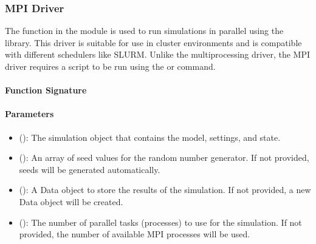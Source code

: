 \documentclass[letterpaper,10pt,english]{sphinxmanual}
\begin{document}
\sphinxstepscope


\subsubsection{MPI Driver}
\label{\detokenize{user_guide/drivers/parallel_driver_mpi:mpi-driver}}\label{\detokenize{user_guide/drivers/parallel_driver_mpi:parallel-driver-mpi}}\label{\detokenize{user_guide/drivers/parallel_driver_mpi::doc}}
\sphinxAtStartPar
The  function in the  module is used to run simulations
in parallel using the  library. This driver is suitable for use in cluster environments
and is compatible with different schedulers like SLURM. Unlike the multiprocessing driver, the MPI driver
requires a script to be run using the  or  command.


\paragraph{Function Signature}
\label{\detokenize{user_guide/drivers/parallel_driver_mpi:function-signature}}
\begin{sphinxVerbatim}[commandchars=\\\{\}]
   
\end{sphinxVerbatim}


\paragraph{Parameters}
\label{\detokenize{user_guide/drivers/parallel_driver_mpi:parameters}}\begin{itemize}
\item {} 
\sphinxAtStartPar
{} (): The simulation object that contains the model, settings, and state.

\item {} 
\sphinxAtStartPar
{} (): An array of seed values for the random number generator. If not provided, seeds will be generated automatically.

\item {} 
\sphinxAtStartPar
{} (): A Data object to store the results of the simulation. If not provided, a new Data object will be created.

\item {} 
\sphinxAtStartPar
{} (): The number of parallel tasks (processes) to use for the simulation. If not provided, the number of available MPI processes will be used.

\end{itemize}
\end{document}
